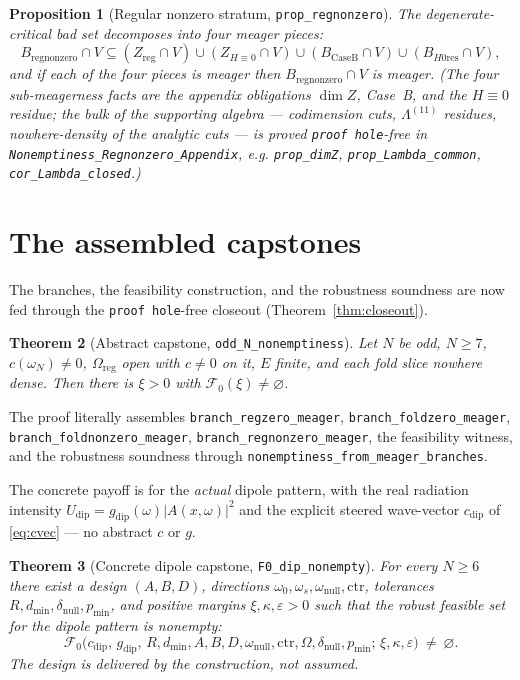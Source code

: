 \documentclass[11pt]{article}
\theoremstyle{plain}
\newtheorem{theorem}{Theorem}[section]
\newtheorem{proposition}[theorem]{Proposition}
\theoremstyle{definition}
\theoremstyle{remark}
\newcommand{\cvec}{c}                 %
\newcommand{\Af}{A}                   %
\newcommand{\gain}{g}                 %
\newcommand{\Fzero}{\mathcal{F}_{0}}  %
\newcommand{\code}[1]{\texttt{\small #1}}
\newcommand{\abs}[1]{\lvert #1 \rvert}
\begin{document}
\begin{proposition}[Regular nonzero stratum, \code{prop\_regnonzero}]\label{prop:regnz}
The degenerate-critical bad set decomposes into four meager pieces:
\[
  B_{\mathrm{regnonzero}}\cap V \subseteq
   (Z_{\mathrm{reg}}\cap V)\cup(Z_{H\equiv0}\cap V)
   \cup(B_{\mathrm{CaseB}}\cap V)\cup(B_{H0\mathrm{res}}\cap V),
\]
and if each of the four pieces is meager then $B_{\mathrm{regnonzero}}\cap V$ is
meager.  (The four sub-meagerness facts are the appendix obligations
$\dim Z$, Case~B, and the $H\!\equiv\!0$ residue; the bulk of the supporting
algebra --- codimension cuts, $\Lambda^{(11)}$ residues, nowhere-density of the
analytic cuts --- is proved \code{proof hole}-free in
\code{Nonemptiness\_Regnonzero\_Appendix}, e.g. \code{prop\_dimZ},
\code{prop\_Lambda\_common}, \code{cor\_Lambda\_closed}.)
\end{proposition}

\section{The assembled capstones}\label{sec:capstone}

The branches, the feasibility construction, and the robustness soundness are now
fed through the \code{proof hole}-free closeout (Theorem~\ref{thm:closeout}).

\begin{theorem}[Abstract capstone, \code{odd\_N\_nonemptiness}]
Let $N$ be odd, $N\ge7$, $\cvec(\omega_N)\ne0$, $\Omega_{\mathrm{reg}}$ open with
$\cvec\ne0$ on it, $E$ finite, and each fold slice nowhere dense.  Then there is
$\xi>0$ with $\Fzero(\xi)\ne\varnothing$.
\end{theorem}

The proof literally assembles \code{branch\_regzero\_meager},
\code{branch\_foldzero\_meager}, \code{branch\_foldnonzero\_meager},
\code{branch\_regnonzero\_meager}, the feasibility witness, and the robustness
soundness through \code{nonemptiness\_from\_meager\_branches}.

The concrete payoff is for the \emph{actual} dipole pattern, with the real
radiation intensity $U_{\mathrm{dip}}=\gain_{\mathrm{dip}}(\omega)\abs{\Af(x,\omega)}^2$
and the explicit steered wave-vector $\cvec_{\mathrm{dip}}$ of \eqref{eq:cvec} ---
no abstract $\cvec$ or $\gain$.

\begin{theorem}[Concrete dipole capstone, \code{F0\_dip\_nonempty}]\label{thm:capstone}
For every $N\ge6$ there exist a design $(A,B,D)$, directions
$\omega_0,\omega_s,\omega_{\mathrm{null}},\mathrm{ctr}$, tolerances
$R,d_{\min},\delta_{\mathrm{null}},p_{\min}$, and positive margins $\xi,\kappa,\varepsilon>0$
such that the robust feasible set for the dipole pattern is nonempty:
\[
  \Fzero\big(\cvec_{\mathrm{dip}},\,\gain_{\mathrm{dip}},\,R,d_{\min},A,B,D,
     \omega_{\mathrm{null}},\mathrm{ctr},\Omega,\delta_{\mathrm{null}},p_{\min};\,
     \xi,\kappa,\varepsilon\big)\ \ne\ \varnothing .
\]
The design is \emph{delivered by the construction}, not assumed.
\end{theorem}
\end{document}
